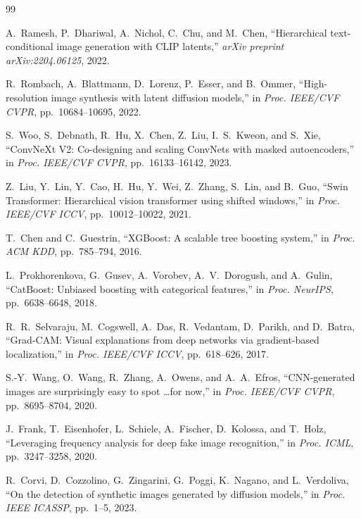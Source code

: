 \documentclass[conference]{IEEEtran}
\begin{document}

\begin{thebibliography}{99}

A.~Ramesh, P.~Dhariwal, A.~Nichol, C.~Chu, and M.~Chen,
``Hierarchical text-conditional image generation with CLIP latents,''
\textit{arXiv preprint arXiv:2204.06125}, 2022.

R.~Rombach, A.~Blattmann, D.~Lorenz, P.~Esser, and B.~Ommer,
``High-resolution image synthesis with latent diffusion models,''
in \textit{Proc. IEEE/CVF CVPR}, pp.~10684--10695, 2022.

S.~Woo, S.~Debnath, R.~Hu, X.~Chen, Z.~Liu, I.~S.~Kweon, and S.~Xie,
``ConvNeXt V2: Co-designing and scaling ConvNets with masked autoencoders,''
in \textit{Proc. IEEE/CVF CVPR}, pp.~16133--16142, 2023.

Z.~Liu, Y.~Lin, Y.~Cao, H.~Hu, Y.~Wei, Z.~Zhang, S.~Lin, and B.~Guo,
``Swin Transformer: Hierarchical vision transformer using shifted windows,''
in \textit{Proc. IEEE/CVF ICCV}, pp.~10012--10022, 2021.

T.~Chen and C.~Guestrin,
``XGBoost: A scalable tree boosting system,''
in \textit{Proc. ACM KDD}, pp.~785--794, 2016.

L.~Prokhorenkova, G.~Gusev, A.~Vorobev, A.~V.~Dorogush, and A.~Gulin,
``CatBoost: Unbiased boosting with categorical features,''
in \textit{Proc. NeurIPS}, pp.~6638--6648, 2018.

R.~R.~Selvaraju, M.~Cogswell, A.~Das, R.~Vedantam, D.~Parikh, and D.~Batra,
``Grad-CAM: Visual explanations from deep networks via gradient-based
localization,''
in \textit{Proc. IEEE/CVF ICCV}, pp.~618--626, 2017.

S.-Y.~Wang, O.~Wang, R.~Zhang, A.~Owens, and A.~A.~Efros,
``CNN-generated images are surprisingly easy to spot \ldots for now,''
in \textit{Proc. IEEE/CVF CVPR}, pp.~8695--8704, 2020.

J.~Frank, T.~Eisenhofer, L.~Schiele, A.~Fischer, D.~Kolossa, and T.~Holz,
``Leveraging frequency analysis for deep fake image recognition,''
in \textit{Proc. ICML}, pp.~3247--3258, 2020.

R.~Corvi, D.~Cozzolino, G.~Zingarini, G.~Poggi, K.~Nagano, and L.~Verdoliva,
``On the detection of synthetic images generated by diffusion models,''
in \textit{Proc. IEEE ICASSP}, pp.~1--5, 2023.


\end{thebibliography}
\end{document}
